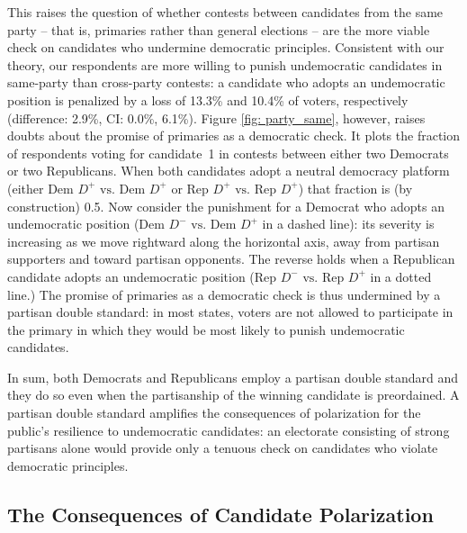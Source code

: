 \documentclass[letterpaper, 12pt]{article}
\begin{document}
\begin{raggedright}
This raises the question of whether contests between candidates from the same party -- that is, primaries rather than general elections -- are the more viable check on candidates who undermine democratic principles. Consistent with our theory, our respondents are more willing to punish undemocratic candidates in same-party than cross-party contests: a candidate who adopts an undemocratic position is penalized by a loss of 13.3\% and 10.4\% of voters, respectively (difference: 2.9\%, CI: 0.0\%, 6.1\%). Figure \ref{fig: party_same}, however, raises doubts about the promise of primaries as a democratic check. It plots the fraction of respondents voting for candidate~1 in contests between either two Democrats or two Republicans. When both candidates adopt a neutral democracy platform (either $\text{Dem }D^+ \text{ vs. } \text{Dem }D^+$ or $\text{Rep }D^+ \text{ vs. } \text{Rep }D^+$) that fraction is (by construction) 0.5. Now consider the punishment for a Democrat who adopts an undemocratic position ($\text{Dem } D^- \text{ vs. } \text{Dem } D^+$ in a dashed line): its severity is increasing as we move rightward along the horizontal axis, away from partisan supporters and toward partisan opponents. The reverse holds when a Republican candidate adopts an undemocratic position ($\text{Rep } D^- \text{ vs. } \text{Rep } D^+$ in a dotted line.) The promise of primaries as a democratic check is thus undermined by a partisan double standard: in most states, voters are not allowed to participate in the primary in which they would be most likely to punish undemocratic candidates.

In sum, both Democrats and Republicans employ a partisan double standard and they do so even when the partisanship of the winning candidate is preordained. A partisan double standard amplifies the consequences of polarization for the public's resilience to undemocratic candidates: an electorate consisting of strong partisans alone would provide only a tenuous check on candidates who violate democratic principles.


\subsection{The Consequences of Candidate Polarization}
\label{sec: platforms}


\end{raggedright}
\end{document}
